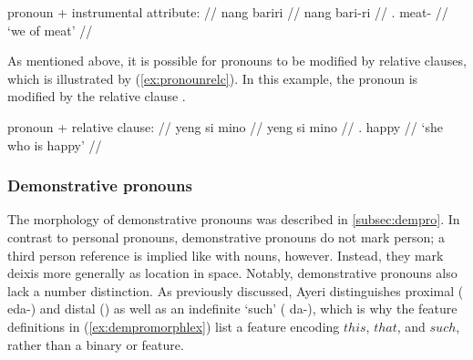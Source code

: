 \a\ljudge* %
	\begin{minipage}[t]{.5\linewidth}
	\begingl
		\glpreamble pronoun + instrumental attribute: //
		\gla nang bariri //
		\glb nang bari-ri //
		\glc \Fpl{}.\Aarg{} meat-\Ins{} //
		\glft `we of meat' //
	\endgl
	\end{minipage}

\xe

As mentioned above, it is possible for pronouns to be modified by relative
clauses, which is illustrated by (\ref{ex:pronounrelc}). In this example, the
pronoun  is modified by the relative clause .

\ex\label{ex:pronounrelc} %
	\begin{minipage}[t]{.5\linewidth}
	\begingl
		\glpreamble pronoun + relative clause: //
		\gla yeng si mino //
		\glb yeng si mino //
		\glc \TsgF{}.\Aarg{} \Rel{} happy //
		\glft `she who is happy' //
	\endgl
	\end{minipage}
\xe

\subsubsection{Demonstrative pronouns}

The morphology of demonstrative pronouns was described in 
\autoref{subsec:dempro}. In contrast to personal pronouns, demonstrative
pronouns do not mark person; a third person reference is implied like with
nouns, however. Instead, they mark deixis more generally as location in space.
Notably, demonstrative pronouns also lack a number distinction. As previously
discussed, Ayeri distinguishes proximal ( {eda-}) and distal
() as well as an indefinite `such' ( {da-}), which is
why the feature definitions in (\ref{ex:dempromorphlex}) list a \Deix{} feature
encoding $this$, $that$, and $such$, rather than a binary \Prox{} or \Dist{}
feature.

